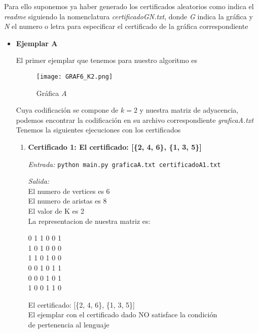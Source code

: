 \documentclass[12pt,letterpaper]{article}
\begin{document}
\begin{itemize}
    Para ello suponemos ya haber generado los certificados aleatorios como indica el \textit{readme} siguiendo la nomenclatura \textit{certificadoGN.txt}, donde \textit{G} indica la gráfica y \textit{N} el numero o letra para especificar el certificado de la gráfica correspondiente
    
    \begin{itemize}
        \item \textbf{Ejemplar A}
        
        El primer ejemplar que tenemos para nuestro algoritmo es
        
        \begin{figure}[htb]
        \centering
        \texttt{[image: GRAF6\_K2.png]}
        \caption{Gráfica $A$}
        \end{figure}
    Cuya codificación se compone de $k=2$ y nuestra matriz de adyacencia, podemos encontrar la codificación en su archivo correspondiente \textit{graficaA.txt}\\
    Tenemos la siguientes ejecuciones con los certificados
        
        \begin{enumerate}
            \item \textbf{Certificado 1: El certificado: [\{2, 4, 6\}, \{1, 3, 5\}]}
            
            \textit{Entrada:} \texttt{python main.py graficaA.txt certificadoA1.txt}
            
            \textit{Salida:}\\
            El numero de vertices es 6\\
            El numero de aristas es 8\\
            El valor de K es 2\\
            \newpage
            La representacion de nuestra matriz es:
            \begin{center}
            0 1 1 0 0 1\\
            1 0 1 0 0 0\\
            1 1 0 1 0 0\\
            0 0 1 0 1 1\\
            0 0 0 1 0 1\\
            1 0 0 1 1 0\\
            \end{center}
            El certificado: [\{2, 4, 6\}, \{1, 3, 5\}]\\
            El ejemplar con el certificado dado NO satisface la condición\\
            de pertenencia al lenguaje
            

\end{enumerate}
\end{itemize}
\end{itemize}
\end{document}
